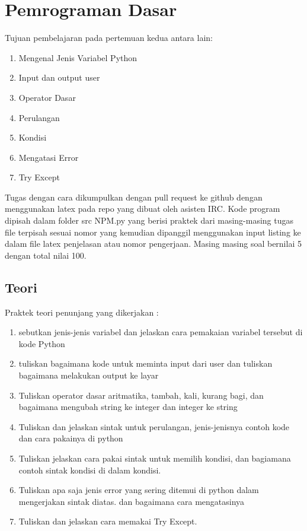 \chapter{Pemrograman Dasar}
Tujuan pembelajaran pada pertemuan kedua antara lain:
\begin{enumerate}
\item
Mengenal Jenis Variabel Python
\item
Input dan output user
\item
Operator Dasar
\item
Perulangan
\item
Kondisi
\item
Mengatasi Error
\item
Try Except
\end{enumerate}
Tugas dengan cara dikumpulkan dengan pull request ke github dengan menggunakan latex pada repo yang dibuat oleh asisten IRC. Kode program dipisah dalam folder src NPM.py yang berisi praktek dari masing-masing tugas file terpisah sesuai nomor yang kemudian dipanggil menggunakan input listing ke dalam file latex penjelasan atau nomor pengerjaan. Masing masing soal bernilai 5 dengan total nilai 100.

\section{Teori}
Praktek teori penunjang yang dikerjakan :
\begin{enumerate}
\item
sebutkan jenis-jenis variabel dan jelaskan cara pemakaian variabel tersebut di kode Python
\item
tuliskan bagaimana kode untuk meminta input dari user dan tuliskan bagaimana melakukan output ke layar
\item
Tuliskan operator dasar aritmatika, tambah, kali, kurang bagi, dan 
bagaimana mengubah string ke integer dan integer ke string
\item
Tuliskan dan jelaskan sintak untuk perulangan, jenis-jenisnya contoh kode dan cara pakainya di python
\item
Tuliskan jelaskan cara pakai sintak untuk memilih kondisi, dan bagiamana contoh sintak kondisi di dalam kondisi.
\item
Tuliskan apa saja jenis error yang sering ditemui di python dalam mengerjakan sintak diatas. 
dan bagaimana cara mengatasinya
\item
Tuliskan dan jelaskan cara memakai Try Except.
\end{enumerate}

